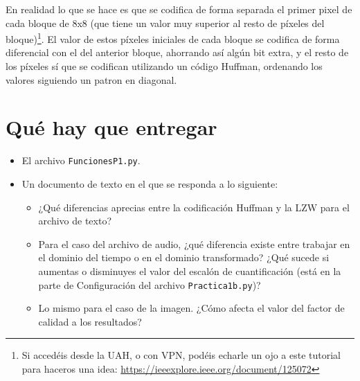 \documentclass[es,practica]{uah}
\begin{document}
En realidad lo que se hace es que se codifica de forma separada el primer pixel de cada bloque de 8x8 (que tiene un valor muy superior al resto de píxeles del bloque)\footnote{Si accedéis desde la UAH, o con VPN, podéis echarle un ojo a este tutorial para haceros una idea: \url{https://ieeexplore.ieee.org/document/125072}}. El valor de estos píxeles iniciales de cada bloque se codifica de forma diferencial con el del anterior bloque, ahorrando así algún bit extra, y el resto de los píxeles sí que se codifican utilizando un código Huffman, ordenando los valores siguiendo un patron en diagonal.



\section{Qué hay que entregar}

\begin{itemize}
	\item El archivo \texttt{FuncionesP1.py}.
	\item Un documento de texto en el que se responda a lo siguiente:
	\begin{itemize}
		\item ¿Qué diferencias aprecias entre la codificación Huffman y la LZW para el archivo de texto?
		\item Para el caso del archivo de audio, ¿qué diferencia existe entre trabajar en el dominio del tiempo o en el dominio transformado? ¿Qué sucede si aumentas o disminuyes el valor del escalón de cuantificación (está en la parte de Configuración del archivo \texttt{Practica1b.py})?
		\item Lo mismo para el caso de la imagen. ¿Cómo afecta el valor del factor de calidad a los resultados?
	\end{itemize}
\end{itemize}

\end{document}
